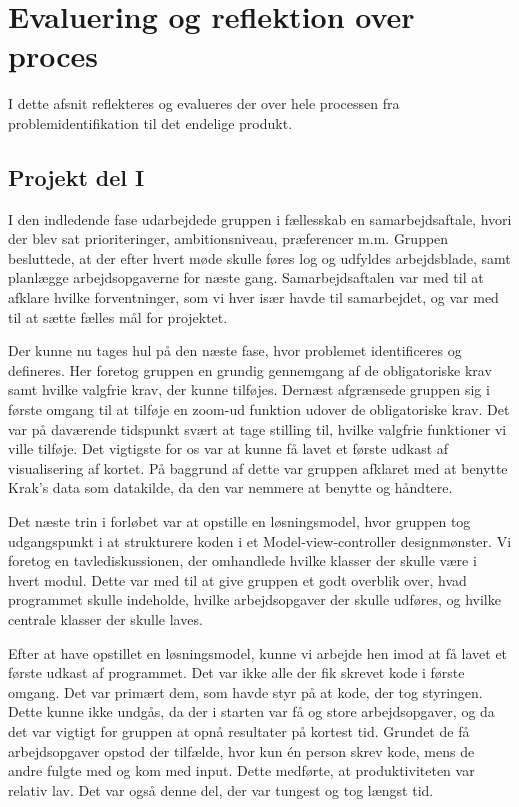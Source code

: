 \section{Evaluering og reflektion over proces}
\label{sec:evaluering_og_reflektion_over_proces}

I dette afsnit reflekteres og evalueres der over hele processen fra problemidentifikation til det endelige produkt. 

\subsection{Projekt del I}

I den indledende fase udarbejdede gruppen i fællesskab en samarbejdsaftale, hvori der blev sat prioriteringer, ambitionsniveau, præferencer m.m. Gruppen besluttede, at der efter hvert møde skulle føres log og udfyldes arbejdsblade, samt planlægge arbejdsopgaverne for næste gang. Samarbejdsaftalen var med til at afklare hvilke forventninger, som vi hver især havde til samarbejdet, og var med til at sætte fælles mål for projektet.

Der kunne nu tages hul på den næste fase, hvor problemet identificeres og defineres. Her foretog gruppen en grundig gennemgang af de obligatoriske krav samt hvilke valgfrie krav, der kunne tilføjes. Dernæst afgrænsede gruppen sig i første omgang til at tilføje en zoom-ud funktion udover de obligatoriske krav. Det var på daværende tidspunkt svært at tage stilling til, hvilke valgfrie funktioner vi ville tilføje. Det vigtigste for os var at kunne få lavet et første udkast af visualisering af kortet. På baggrund af dette var gruppen afklaret med at benytte Krak's data som datakilde, da den var nemmere at benytte og håndtere.   

Det næste trin i forløbet var at opstille en løsningsmodel, hvor gruppen tog udgangspunkt i at strukturere koden i et Model-view-controller designmønster. Vi foretog en tavlediskussionen, der omhandlede hvilke klasser der skulle være i hvert modul. Dette var med til at give gruppen et godt overblik over, hvad programmet skulle indeholde, hvilke arbejdsopgaver der skulle udføres, og hvilke centrale klasser der skulle laves. 

Efter at have opstillet en løsningsmodel, kunne vi arbejde hen imod at få lavet et første udkast af programmet. Det var ikke alle der fik skrevet kode i første omgang. Det var primært dem, som havde styr på at kode, der tog styringen. Dette kunne ikke undgås, da der i starten var få og store arbejdsopgaver, og da det var vigtigt for gruppen at opnå resultater på kortest tid. Grundet de få arbejdsopgaver opstod der tilfælde, hvor kun én person skrev kode, mens de andre fulgte med og kom med input. Dette medførte, at produktiviteten var relativ lav. Det var også denne del, der var tungest og tog længst tid. 

